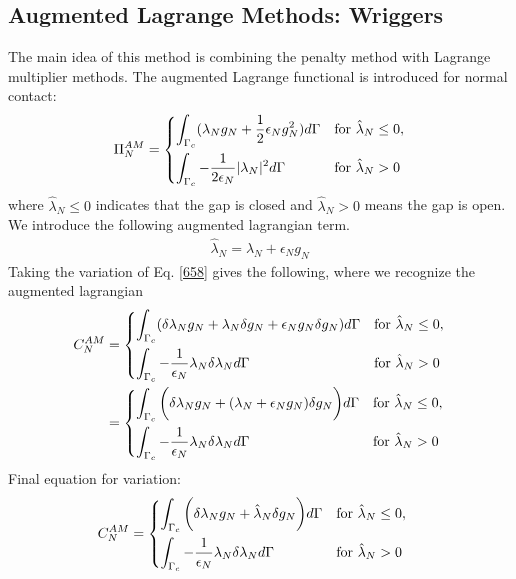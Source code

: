 \documentclass[12pt,3p]{article}
\begin{document}
\subsection{Augmented Lagrange Methods: Wriggers}
The main idea of this method is combining the penalty method with Lagrange multiplier methods. The augmented Lagrange functional is introduced for normal contact: 
\begin{align}\label{658}
\Pi_{N}^{AM} = 
\begin{dcases}
    \int_{\Gamma_c} (\lambda_N g_N + \frac{1}{2} \epsilon_N g_N^2) d \Gamma & \text{for } \hat{\lambda}_N \leq 0, \\
    \int_{\Gamma_c} -\frac{1}{2 \epsilon_N} |\lambda_N|^2 d \Gamma               & \text{for } \hat{\lambda}_N > 0
\end{dcases}
\end{align}
where $ \hat{\lambda}_N \leq 0$ indicates that the gap is closed and $\hat{\lambda}_N > 0$ means the gap is open. We introduce the following augmented lagrangian term.
\begin{align*}
\hat{\lambda}_N = \lambda_N + \epsilon_N g_N
\end{align*}
Taking the variation of Eq. \ref{658} gives the following, where we recognize the augmented lagrangian 
\begin{align*}
C_{N}^{AM} &= 
\begin{dcases}
    \int_{\Gamma_c} (\delta \lambda_N g_N + \lambda_N \delta g_N + \epsilon_N g_N \delta g_N) d \Gamma & \text{for } \hat{\lambda}_N \leq 0, \\
    \int_{\Gamma_c} -\frac{1}{\epsilon_N} \lambda_N \delta \lambda_N d \Gamma               & \text{for } \hat{\lambda}_N > 0
\end{dcases} \\
&= 
\begin{dcases}
    \int_{\Gamma_c} \bigg( \delta \lambda_N g_N + (\lambda_N + \epsilon_N g_N) \delta g_N \bigg) d \Gamma & \text{for } \hat{\lambda}_N \leq 0, \\
    \int_{\Gamma_c} -\frac{1}{\epsilon_N} \lambda_N \delta \lambda_N d \Gamma               & \text{for } \hat{\lambda}_N > 0
\end{dcases} 
\end{align*}
Final equation for variation: 
\begin{align}\label{659}
C_{N}^{AM} &= 
\begin{dcases}
    \int_{\Gamma_c} \bigg( \delta \lambda_N g_N + \hat{\lambda}_N \delta g_N \bigg) d \Gamma & \text{for } \hat{\lambda}_N \leq 0, \\
    \int_{\Gamma_c} -\frac{1}{\epsilon_N} \lambda_N \delta \lambda_N d \Gamma               & \text{for } \hat{\lambda}_N > 0
\end{dcases}
\end{align}
\end{document}
